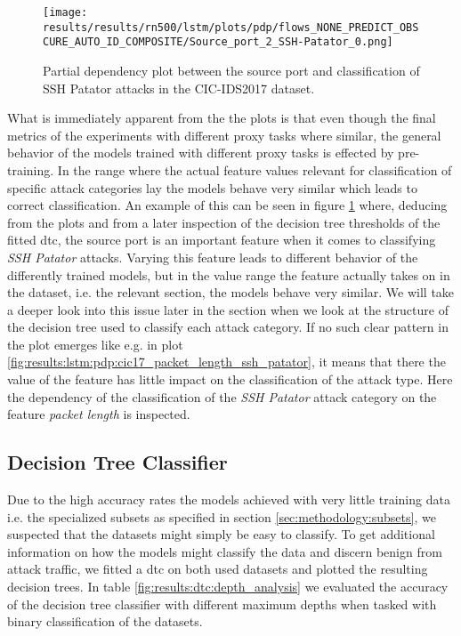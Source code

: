 \begin{figure}[h]
	\centering
	\texttt{[image: results/results/rn500/lstm/plots/pdp/flows\_NONE\_PREDICT\_OBSCURE\_AUTO\_ID\_COMPOSITE/Source\_port\_2\_SSH-Patator\_0.png]}
	\caption{Partial dependency plot between the source port and classification of SSH Patator attacks in the CIC-IDS2017 dataset.}
	\label{fig:results:lstm:pdp:cic17_source_port_ssh_patator}
\end{figure}

What is immediately apparent from the the plots is that even though the final metrics of the experiments with different proxy tasks where similar, the general behavior of the models trained with different proxy tasks is effected by pre-training. In the range where the actual feature values relevant for classification of specific attack categories lay the models behave very similar which leads to correct classification. An example of this can be seen in figure \ref{fig:results:lstm:pdp:cic17_source_port_ssh_patator} where, deducing from the plots and from a later inspection of the decision tree thresholds of the fitted \gls{dtc}, the source port is an important feature when it comes to classifying \textit{SSH Patator} attacks. Varying this feature leads to different behavior of the differently trained models, but in the value range the feature actually takes on in the dataset, i.e. the relevant section, the models behave very similar. We will take a deeper look into this issue later in the section when we look at the structure of the decision tree used to classify each attack category. If no such clear pattern in the plot emerges like e.g. in plot \ref{fig:results:lstm:pdp:cic17_packet_length_ssh_patator}, it means that there the value of the feature has little impact on the classification of the attack type. Here the dependency of the classification of the \textit{SSH Patator} attack category on the feature \textit{packet length} is inspected.

\FloatBarrier

\subsection{Decision Tree Classifier}

Due to the high accuracy rates the models achieved with very little training data i.e. the specialized subsets as specified in section \ref{sec:methodology:subsets}, we suspected that the datasets might simply be easy to classify. To get additional information on how the models might classify the data and discern benign from attack traffic, we fitted a \gls{dtc} on both used datasets and plotted the resulting decision trees. In table \ref{fig:results:dtc:depth_analysis} we evaluated the accuracy of the decision tree classifier with different maximum depths when tasked with binary classification of the datasets. 

